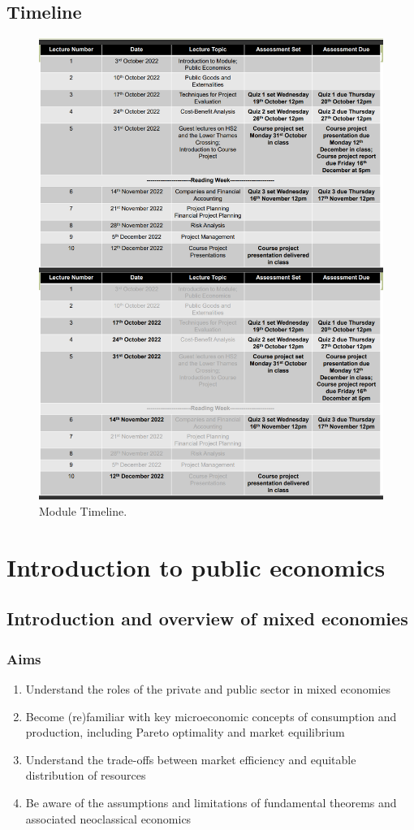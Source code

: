 \documentclass[class=report, crop=false, 12pt,a4paper]{standalone}
\begin{document}
\section{Timeline}
\begin{figure}[H]
	\centering
	\includegraphics[width = 0.9 \textwidth]{../img/figure2.png}
	\caption{Module Timeline.}
\end{figure}
\chapter{Introduction to public economics}
\section{Introduction and overview of mixed economies}
\subsection{Aims}
\begin{enumerate}
	\item Understand the roles of the private and public sector in mixed economies
	\item Become (re)familiar with key microeconomic concepts of consumption and production, including Pareto optimality and market equilibrium
	\item Understand the trade-offs between market efficiency and equitable distribution of resources
	\item Be aware of the assumptions and limitations of fundamental theorems and associated neoclassical economics
\end{enumerate}
\end{document}
